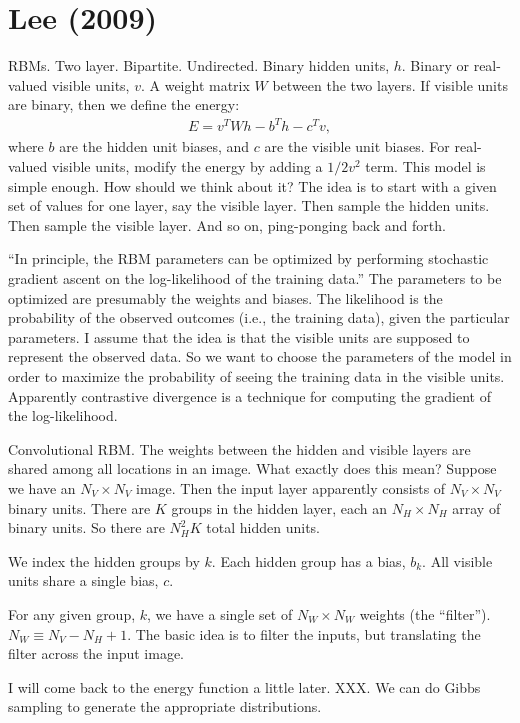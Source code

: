 \documentclass[12pt]{report}
\begin{document}
\section{Lee (2009)} 

RBMs.  Two layer.  Bipartite.  Undirected.  Binary hidden units, $h$.
Binary or real-valued visible units, $v$.  A weight matrix $W$ between
the two layers.  If visible units are binary, then we define the
energy:
\begin{eqnarray}
  E = v^T W h - b^T h-c^T v,
\end{eqnarray}
where $b$ are the hidden unit biases, and $c$ are the visible unit
biases.  For real-valued visible units, modify the energy by adding a
$1/2 v^2$ term.  This model is simple enough.  How should we think
about it?  The idea is to start with a given set of values for one
layer, say the visible layer.  Then sample the hidden units.  Then
sample the visible layer.  And so on, ping-ponging back and forth.

``In principle, the RBM parameters can be optimized by performing
stochastic gradient ascent on the log-likelihood of the training
data.''  The parameters to be optimized are presumably the weights and
biases.  The likelihood is the probability of the observed outcomes
(i.e., the training data), given the particular parameters.  I assume
that the idea is that the visible units are supposed to represent the
observed data.  So we want to choose the parameters of the model in
order to maximize the probability of seeing the training data in the
visible units.  Apparently contrastive divergence is a technique for
computing the gradient of the log-likelihood.

Convolutional RBM. The weights between the hidden and visible layers
are shared among all locations in an image.  What exactly does this
mean?  Suppose we have an $N_V \times N_V$ image.  Then the input
layer apparently consists of $N_V \times N_V$ binary units.  There are
$K$ groups in the hidden layer, each an $N_H \times N_H$ array of
binary units.  So there are $N_H^2 K$ total hidden units.

We index the hidden groups by $k$.  Each hidden group has a bias,
$b_k$.  All visible units share a single bias, $c$.

For any given group, $k$, we have a single set of $N_W \times N_W$
weights (the ``filter'').  $N_W \equiv N_V-N_H+1$.  The basic idea is
to filter the inputs, but translating the filter across the input
image.

I will come back to the energy function a little later.  XXX.  We can
do Gibbs sampling to generate the appropriate distributions.
\end{document}
